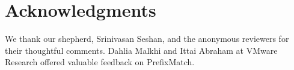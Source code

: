 
\section*{Acknowledgments}
We thank our shepherd, Srinivasan Seshan, and the anonymous reviewers for their thoughtful comments. Dahlia Malkhi and Ittai Abraham at VMware Research offered valuable feedback on PrefixMatch.